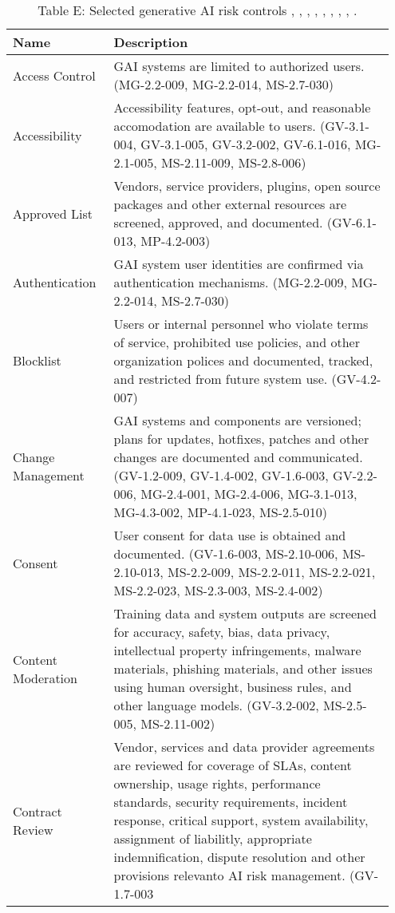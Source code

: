 \documentclass[fleqn]{article}
\begin{document}
\begin{table}[H]
	\caption*{Table E: Selected generative AI risk controls \cite{airmf}, \cite{playbook}, \cite{ai600-1}, \cite{iso42001}, \cite{mcgraw2024architectural}, \cite{mcgraw2020architectural}, \cite{msft_rai_std}, \cite{uk_ai_safety}, \cite{occ_mrm}. }
	\label{tab:controls}
	\footnotesize
	\begin{tabular}{|m{0.25\linewidth} |m{0.70\linewidth} |}
		\hline
		\textbf{Name} & \textbf{Description} \\
		\hline
		Access Control  & GAI systems are limited to authorized users. (MG-2.2-009, MG-2.2-014, MS-2.7-030) \\ \hline
		Accessibility  & Accessibility features, opt-out, and reasonable accomodation are available to users. (GV-3.1-004, GV-3.1-005, GV-3.2-002, GV-6.1-016, MG-2.1-005, MS-2.11-009, MS-2.8-006) \\ \hline
		Approved List & Vendors, service providers, plugins, open source packages and other external resources are screened, approved, and documented. (GV-6.1-013, MP-4.2-003) \\ \hline
		Authentication  & GAI system user identities are confirmed via authentication mechanisms. (MG-2.2-009, MG-2.2-014, MS-2.7-030) \\ \hline
		Blocklist & Users or internal personnel who violate terms of service, prohibited use policies, and other organization polices and documented, tracked, and restricted from future system use. (GV-4.2-007) \\ \hline		
		Change Management & GAI systems and components are versioned; plans for updates, hotfixes, patches and other changes are documented and communicated. (GV-1.2-009, GV-1.4-002, GV-1.6-003, GV-2.2-006, 		MG-2.4-001, MG-2.4-006, MG-3.1-013, MG-4.3-002, MP-4.1-023, 
		MS-2.5-010)  \\ \hline
		Consent & User consent for data use is obtained and documented. (GV-1.6-003, MS-2.10-006, MS-2.10-013, MS-2.2-009, MS-2.2-011, 	MS-2.2-021, MS-2.2-023, MS-2.3-003, MS-2.4-002)  \\ \hline
		Content Moderation & Training data and system outputs are screened for accuracy, safety, bias, data privacy, intellectual property infringements, malware materials, phishing materials, and other issues using human oversight, business rules, and other language models. (GV-3.2-002, MS-2.5-005, MS-2.11-002)  \\ \hline
		Contract Review & Vendor, services and data provider agreements are reviewed for coverage of SLAs, content ownership, usage rights, performance standards, security requirements, incident response, critical support, system availability, assignment of liabilitly, appropriate indemnification, dispute resolution and other provisions relevanto AI risk management. (GV-1.7-003

\end{tabular}
\end{table}
\end{document}

